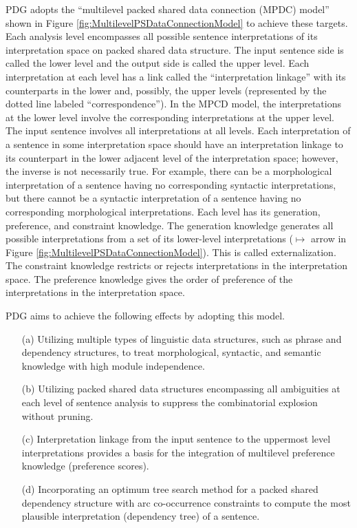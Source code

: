 \documentclass[english]{jnlp_1.4_rep}
\theoremstyle{break}
\theoremstyle{plain}
\theoremstyle{plain}
\begin{document}
\noindent
PDG adopts the ``multilevel packed shared data connection
\pagebreak
(MPDC) model'' shown in Figure \ref{fig:MultilevelPSDataConnectionModel}
to achieve these targets. Each analysis level encompasses all possible
sentence interpretations of its interpretation space on packed
shared data structure. The input sentence side is called the lower
level and the output side is called the upper level. Each
interpretation at each level has a link called the ``interpretation
linkage'' with its counterparts in the lower and, possibly, the upper
levels (represented by the dotted line labeled ``correspondence''). In
the MPCD model, the interpretations at the lower level involve the
corresponding interpretations at the upper level. The input sentence
involves all interpretations at all levels.  Each interpretation of a
sentence in some interpretation space should have an interpretation
linkage to its counterpart in the lower adjacent level of the
interpretation space; however, the inverse is not necessarily
true. For example, there can be a morphological interpretation of a
sentence having no corresponding syntactic interpretations, but there
cannot be a syntactic interpretation of a sentence having no
corresponding morphological interpretations. Each level has its
generation, preference, and constraint knowledge. The generation
knowledge generates all possible interpretations from a set of its
lower-level interpretations ($\longmapsto$ arrow in
Figure \ref{fig:MultilevelPSDataConnectionModel}). This is called
externalization. The constraint knowledge restricts or rejects
interpretations in the interpretation space. The preference knowledge
gives the order of preference of the interpretations in the
interpretation space.

PDG aims to achieve the following effects by adopting this model.

\begin{itemize}
\item[(a)] Utilizing multiple types of linguistic data structures, such as phrase and dependency 
\linebreak
structures, to treat morphological, syntactic, and semantic knowledge with high module independence.
\item[(b)] Utilizing packed shared data structures encompassing all ambiguities at each level of sentence analysis to suppress the combinatorial explosion without pruning.
\item[(c)] Interpretation linkage from the input sentence to the
uppermost level interpretations provides a basis for the integration
of multilevel preference knowledge (preference scores).
\item[(d)] Incorporating an optimum tree search method for a packed shared dependency structure with arc co-{\nobreak}occurrence constraints to compute the most plausible interpretation (dependency tree) of a sentence.
\end{itemize}
\end{document}
